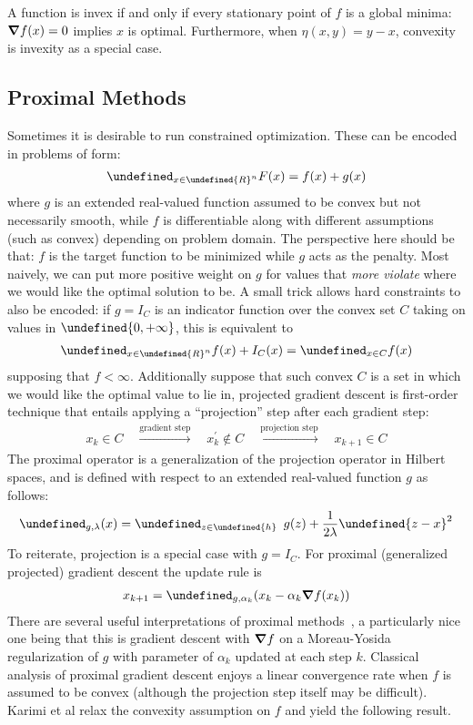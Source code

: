 \documentclass[11pt]{article}  %
\let\mbb\undefined
\newcommand{\mbb}[1]{\mathbb{#1}}
\let\braces\undefined
\newcommand{\braces}[1]{\left\{#1\right\}}
\let\norm\undefined
\newcommand{\norm}[1]{\lVert #1 \rVert}
\let\dom\undefined
\DeclareMathOperator{\dom}{dom}
\let\argmin\undefined
\DeclareMathOperator*{\argmin}{arg\,min}
\let\prox\undefined
\DeclareMathOperator{\prox}{prox}
\begin{document}
A function is invex if and only if every stationary point of \(f\)
is a global minima:
\(\grad f(x) = 0\) implies \(x\) is optimal.
Furthermore, when \(\eta(x, y) = y - x\),
convexity is invexity as a special case.


\subsection{Proximal Methods}
Sometimes it is desirable to run constrained optimization.
These can be encoded in problems of form:
\begin{align}
  \argmin_{x \in \mbb{R}^n} F(x) = f(x) + g(x)
  \label{eq:prox-opt}
\end{align}
where \(g\) is an extended real-valued function
assumed to be convex but not necessarily smooth,
while \(f\) is differentiable along with different assumptions
(such as convex) depending on problem domain.
The perspective here should be that: \(f\) is the target function
to be minimized while \(g\) acts as the penalty.
Most naively, we can put more positive weight on \(g\) for values that
\textit{more violate} where we would like the optimal solution to be.
A small trick allows hard constraints to also be encoded:
if \(g = I_C\) is an indicator function over the convex set \(C\)
taking on values in \(\braces{0, + \infty}\),
this is equivalent to
\begin{align}
  \argmin_{x \in \mbb{R}^n} f(x) + I_C (x)
    = \argmin_{x \in C} f(x)
\end{align}
supposing that \(f < \infty\).
Additionally suppose that such convex \(C\) is a set in which we would like
the optimal value to lie in,
projected gradient descent is first-order technique
that entails applying a ``projection'' step after each gradient step:
\begin{align}
  x_k \in C
  \quad \xrightarrow{\text{gradient step}} \quad
  x_k ^\prime \not\in C
  \quad \xrightarrow{\text{projection step}} \quad
  x_{k + 1} \in C
\end{align}
The proximal operator
is a generalization of the projection operator in Hilbert
spaces, and is defined with respect to an extended real-valued function
\(g\) as follows:
\begin{align}
  \prox_{g, \lambda} (x)
    = \argmin_{z \in \dom{h}}
      \enskip {g(z) + \frac{1}{2 \lambda} \norm{z - x}^2}
\end{align}
To reiterate, projection is a special case with \(g = I_C\).
For proximal (generalized projected) gradient descent
the update rule is
\begin{align}
  x_{k + 1} = \prox_{g, \alpha_k} (x_k - \alpha_k \grad f(x_k))
\end{align}
There are several useful interpretations
of proximal methods~\cite{parikh2014proximal,rockafellar1970convex},
a particularly nice one being that this is gradient descent with \(\grad f\)
on a Moreau-Yosida regularization of \(g\) with parameter of \(\alpha_k\)
updated at each step \(k\).
Classical analysis of proximal gradient descent enjoys a linear convergence
rate when \(f\) is assumed to be convex
(although the projection step itself may be difficult).
Karimi et al relax the convexity assumption on \(f\)
and yield the following result.
\end{document}

